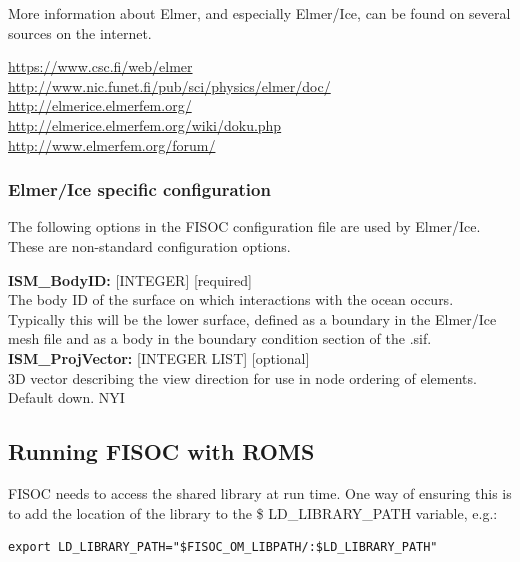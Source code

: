 \documentclass[12pt]{article}
\begin{document}
More information about Elmer, and especially Elmer/Ice, can be found on several sources 
on the internet.

\begin{flushleft}
\url{https://www.csc.fi/web/elmer}\\
\url{http://www.nic.funet.fi/pub/sci/physics/elmer/doc/}\\
\url{http://elmerice.elmerfem.org/}\\
\url{http://elmerice.elmerfem.org/wiki/doku.php}\\
\url{http://www.elmerfem.org/forum/}\\
\end{flushleft}



\subsubsection{Elmer/Ice specific configuration}

The following options in the FISOC configuration file are used by Elmer/Ice.  These 
are non-standard configuration options.

\begin{flushleft}
\textbf{ISM\_BodyID:} [INTEGER] [required]                               \\
The body ID of the surface on which interactions with the ocean occurs.  
Typically this will be the lower surface, defined as a boundary in the   
Elmer/Ice mesh file and as a body in the boundary condition section of   
the .sif.                                                                \\
\vspace{6pt}
\textbf{ISM\_ProjVector:} [INTEGER LIST] [optional]                      \\
3D vector describing the view direction for use in node ordering of      
elements.  Default down.  NYI                                            \\
\vspace{6pt}
\end{flushleft}





\subsection{Running FISOC with ROMS}
\label{sec:runningROMS}

FISOC needs to access the shared library at run time.  One way of ensuring this 
is to add the location of the library to the \$ LD\_LIBRARY\_PATH variable, e.g.:
\begin{lstlisting}
export LD_LIBRARY_PATH="$FISOC_OM_LIBPATH/:$LD_LIBRARY_PATH"
\end{lstlisting}
\end{document}
